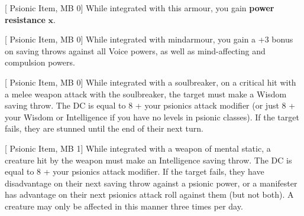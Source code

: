 [%
    Psionic Item, MB 0]
While integrated with this armour,
you gain \textbf{power resistance} $\mathbf{x}$.

[%
    Psionic Item, MB 0]
While integrated with mindarmour,
you gain a +3 bonus on saving throws against all Voice powers,
as well as mind-affecting and compulsion powers.

[%
    Psionic Item, MB 0]
While integrated with a soulbreaker,
on a critical hit with a melee weapon attack with the soulbreaker,
the target must make a Wisdom saving throw.
The DC is equal to 8 + your psionics attack modifier
(or just 8 + your Wisdom or Intelligence if you have no levels
in psionic classes).
If the target fails,
they are stunned until the end of their next turn.

[%
    Psionic Item, MB 1]
While integrated with a weapon of mental static,
a creature hit by the weapon must make an Intelligence saving throw.
The DC is equal to 8 + your psionics attack modifier.
If the target fails,
they have disadvantage on their next saving throw against a psionic power,
or a manifester has advantage on their next
psionics attack roll against them (but not both).
A creature may only be affected in this manner three times per day.
